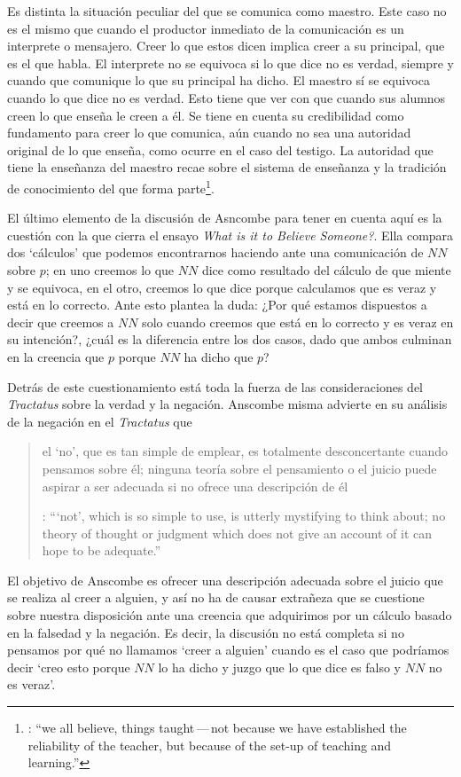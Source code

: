 Es distinta la situación peculiar del que se comunica como maestro. Este caso no es el mismo que cuando el productor inmediato de la comunicación es un interprete o mensajero. Creer lo que estos dicen implica creer a su principal, que es el que habla. El interprete no se equivoca si lo que dice no es verdad, siempre y cuando que comunique lo que su principal ha dicho. El maestro sí se equivoca cuando lo que dice no es verdad. Esto tiene que ver con que cuando sus alumnos creen lo que enseña le creen a él. Se tiene en cuenta su credibilidad como fundamento para creer lo que comunica, aún cuando no sea una autoridad original de lo que enseña, como ocurre en el caso del testigo. La autoridad que tiene la enseñanza del maestro recae sobre el sistema de enseñanza y la tradición de conocimiento del que forma parte\footnote{\cite[Cf.~][214]{teichmann2008ans}: \enquote{we all believe, things taught\,---\,not because we have established the reliability of the teacher, but because of the set-up of teaching and learning.}}.

El último elemento de la discusión de Asncombe para tener en cuenta aquí es la cuestión con la que cierra el ensayo \emph{What is it to Believe Someone?}. Ella compara dos `cálculos' que podemos encontrarnos haciendo ante una comunicación de $NN$ sobre $p$; en uno creemos lo que $NN$ dice como resultado del cálculo de que miente y se equivoca, en el otro, creemos lo que dice porque calculamos que es veraz y está en lo correcto. Ante esto plantea la duda: ¿Por qué estamos dispuestos a decir que creemos a $NN$ solo cuando creemos que está en lo correcto y es veraz en su intención?, ¿cuál es la diferencia entre los dos casos, dado que ambos culminan en la creencia que $p$ porque $NN$ ha dicho que $p$?

Detrás de este cuestionamiento está toda la fuerza de las consideraciones del \emph{Tractatus} sobre la verdad y la negación. Anscombe misma advierte en su análisis de la negación en el \emph{Tractatus} que \blockquote[{\cite[19]{anscombe1959iwt}}: \enquote{`not', which is so simple to use, is utterly mystifying to think about; no theory of thought or judgment which does not give an account of it can hope to be adequate.}]{el `no', que es tan simple de emplear, es totalmente desconcertante cuando pensamos sobre él; ninguna teoría sobre el pensamiento o el juicio puede aspirar a ser adecuada si no ofrece una descripción de él}. El objetivo de Anscombe es ofrecer una descripción adecuada sobre el juicio que se realiza al creer a alguien, y así no ha de causar extrañeza que se cuestione sobre nuestra disposición ante una creencia que adquirimos por un cálculo basado en la falsedad y la negación. Es decir, la discusión no está completa si no pensamos por qué no llamamos `creer a alguien' cuando es el caso que podríamos decir \enquote*{creo esto porque $NN$ lo ha dicho y juzgo que lo que dice es falso y $NN$ no es veraz}.

